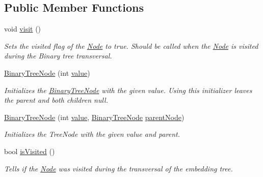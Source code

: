 \subsection*{Public Member Functions}
\begin{DoxyCompactItemize}
\item 
void \hyperlink{class_binary_tree_amortized_analyis_1_1_binary_tree_node_a9e14d898676cd3cdefe9a666f83f8d51}{visit} ()
\begin{DoxyCompactList}\small\item\em Sets the visited flag of the \hyperlink{class_binary_tree_amortized_analyis_1_1_node}{Node} to true. Should be called when the \hyperlink{class_binary_tree_amortized_analyis_1_1_node}{Node} is visited during the Binary tree transversal. \end{DoxyCompactList}\item 
\hyperlink{class_binary_tree_amortized_analyis_1_1_binary_tree_node_a4ee5bd8aec684841e242e71132a4a7b2}{Binary\+Tree\+Node} (int \hyperlink{class_binary_tree_amortized_analyis_1_1_node_a8489bd56607921a85529e723135db6aa}{value})
\begin{DoxyCompactList}\small\item\em Initializes the \hyperlink{class_binary_tree_amortized_analyis_1_1_binary_tree_node}{Binary\+Tree\+Node} with the given value. Using this initializer leaves the parent and both children null. \end{DoxyCompactList}\item 
\hyperlink{class_binary_tree_amortized_analyis_1_1_binary_tree_node_ae74a2ed3bd6152008580228a943d6345}{Binary\+Tree\+Node} (int \hyperlink{class_binary_tree_amortized_analyis_1_1_node_a8489bd56607921a85529e723135db6aa}{value}, \hyperlink{class_binary_tree_amortized_analyis_1_1_binary_tree_node}{Binary\+Tree\+Node} \hyperlink{class_binary_tree_amortized_analyis_1_1_binary_tree_node_a66851e31edeac9c93a6b0cc69ac1f96c}{parent\+Node})
\begin{DoxyCompactList}\small\item\em Initializes the Tree\+Node with the given value and parent. \end{DoxyCompactList}\item 
bool \hyperlink{class_binary_tree_amortized_analyis_1_1_binary_tree_node_a7811e64acbedf6939ac24de2ab227bad}{is\+Visited} ()
\begin{DoxyCompactList}\small\item\em Tells if the \hyperlink{class_binary_tree_amortized_analyis_1_1_node}{Node} was visited during the transversal of the embedding tree. \end{DoxyCompactList}\item 

\end{DoxyCompactItemize}
